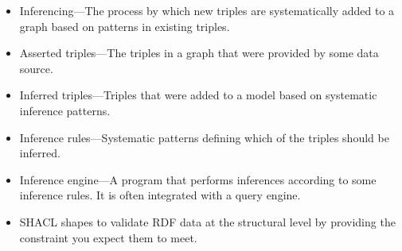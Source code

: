 \begin{itemize}
\item Inferencing---The process by which new triples are systematically added
to a graph based on patterns in existing triples.

\item Asserted triples---The triples in a graph that were provided by some
data source.

\item Inferred triples---Triples that were added to a model based on
systematic inference patterns.

\item Inference rules---Systematic patterns defining which of the triples
should be inferred.

\item Inference engine---A program that performs inferences according to some
inference rules. It is often integrated with a query engine.

\item
  SHACL shapes to validate RDF data at the structural level by providing
  the constraint you expect them to meet.
  \end{itemize}
  
